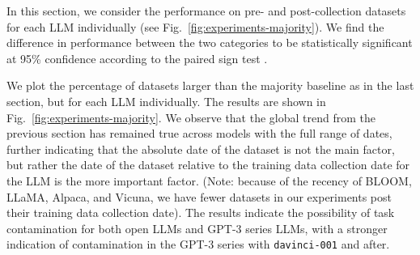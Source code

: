 \documentclass[letterpaper]{article} %
\newcommand{\redx}{$\color{red}\textbf{X}$}
\newcommand{\jmf}[1]{}      %
\begin{document}

In this section, we consider the performance on pre- and post-collection datasets for each LLM individually (see Fig.~\ref{fig:experiments-majority}).\jmf{Add summary of results. We find...} We find the difference in performance between the two categories to be statistically significant at 95\% confidence according to the paired sign test \cite{Dixon1946}.

We plot the percentage of datasets larger than the majority baseline as in the last section, but for each LLM individually. The results are shown in Fig.~\ref{fig:experiments-majority}. We observe that the global trend from the previous section has remained true across models with the full range of dates, further indicating that the absolute date of the dataset is not the main factor, but rather the date of the dataset relative to the training data collection date for the LLM is the more important factor. (Note: because of the recency of BLOOM, LLaMA, Alpaca, and Vicuna, we have fewer datasets in our experiments post their training data collection date).  The results indicate the possibility of task contamination for both open LLMs and GPT-3 series LLMs, with a stronger indication of contamination in the GPT-3 series with \texttt{davinci-001} and after.\jmf{add conclusion to beginning of section}



\end{document}
